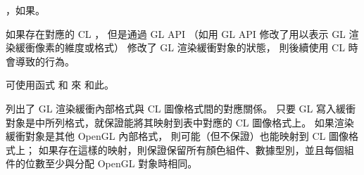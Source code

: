 \item {}，如果\schostfailres。
\stopigBase

如果存在對應的 CL ，
但是通過 GL API （如用 GL API 
 修改了用以表示 GL 渲染緩衝像素的維度或格式）
修改了 GL 渲染緩衝對象的狀態，
則後續使用 CL 時會導致的行為。

可使用函式  和  來
和此。

列出了 GL 渲染緩衝內部格式與 CL 圖像格式間的對應關係。
只要 GL 寫入緩衝對象是中所列格式，就保證能將其映射到表中對應的 CL 圖像格式上。
如果渲染緩衝對象是其他 OpenGL 內部格式，
則可能（但不保證）也能映射到 CL 圖像格式上；
如果存在這樣的映射，則保證保留所有顏色組件、數據型別，並且每個組件的位數至少與分配 OpenGL 對象時相同。

